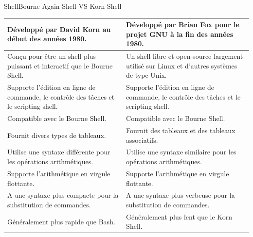 \documentclass{beamer}
\begin{document}
\begin{frame}{Shell}{Bourne Again Shell VS Korn Shell}
\begin{tiny}
\begin{table}[h!]
\begin{tabular}{|p{5.5cm}|p{5.5cm}|}
                    \hline
                    Développé par David Korn au début des années 1980.                                                             & Développé par Brian Fox pour le projet GNU à la fin des années 1980.                                               \\
                    \hline
                    Conçu pour être un shell plus puissant et interactif que le Bourne Shell.                                      & Un shell libre et open-source largement utilisé sur Linux et d'autres systèmes de type Unix.                       \\
                    \hline
                    Supporte l'édition en ligne de commande, le contrôle des tâches et le scripting shell. & Supporte l'édition en ligne de commande, le contrôle des tâches et le scripting shell. \\
                    \hline
                    Compatible avec le Bourne Shell.                                                                               & Compatible avec le Bourne Shell.                                                                                   \\
                    \hline
                    Fournit divers types de tableaux.                                                                              & Fournit des tableaux et des tableaux associatifs.                                                                  \\
                    \hline
                    Utilise une syntaxe différente pour les opérations arithmétiques.                                              & Utilise une syntaxe similaire pour les opérations arithmétiques.                                                   \\
                    \hline
                    Supporte l'arithmétique en virgule flottante.                                                                  & Supporte l'arithmétique en virgule flottante.                                                                      \\
                    \hline
                    A une syntaxe plus compacte pour la substitution de commandes.                                                 & A une syntaxe plus verbeuse pour la substitution de commandes.                                                     \\
                    \hline
                    Généralement plus rapide que Bash.                                                                             & Généralement plus lent que le Korn Shell.                                                                          \\
                    \hline
                \end{tabular}
            \end{table}
        \end{tiny}
    \end{frame}
\end{document}
